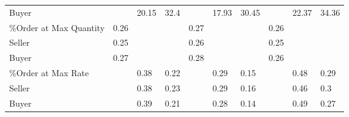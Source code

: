 \begin{tabular}{llllllllll}
 Buyer                  &          & 20.15         & 32.4          &          & 17.93         & 30.45         &           & 22.37         & 34.36         \\
 \%Order at Max Quantity & 0.26     &               &               & 0.27     &               &               & 0.26      &               &               \\
 Seller                 & 0.25     &               &               & 0.26     &               &               & 0.25      &               &               \\
 Buyer                  & 0.27     &               &               & 0.28     &               &               & 0.26      &               &               \\
 \%Order at Max Rate     &          & 0.38          & 0.22          &          & 0.29          & 0.15          &           & 0.48          & 0.29          \\
 Seller                 &          & 0.38          & 0.23          &          & 0.29          & 0.16          &           & 0.46          & 0.3           \\
 Buyer                  &          & 0.39          & 0.21          &          & 0.28          & 0.14          &           & 0.49          & 0.27          \\
\hline
\end{tabular}